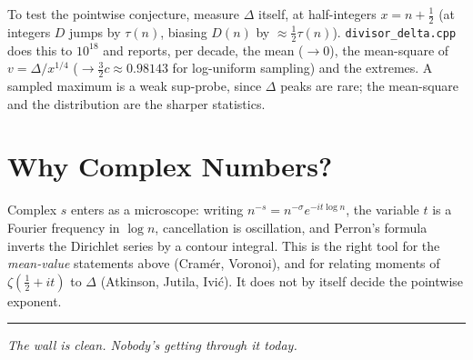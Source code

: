 \documentclass[12pt]{article}
\theoremstyle{definition}
\begin{document}
To test the pointwise conjecture, measure $\Delta$ itself, at half-integers $x=n+\tfrac12$
(at integers $D$ jumps by $\tau(n)$, biasing $D(n)$ by $\approx\tfrac12\tau(n)$).
\texttt{divisor\_delta.cpp} does this to $10^{18}$ and reports, per decade,
the mean ($\to0$), the mean-square of $v=\Delta/x^{1/4}$ ($\to\tfrac32c\approx0.98143$ for
log-uniform sampling) and the extremes.  A sampled maximum is a weak sup-probe, since
$\Delta$ peaks are rare; the mean-square and the distribution are the sharper statistics.

\section{Why Complex Numbers?}

Complex $s$ enters as a microscope: writing $n^{-s}=n^{-\sigma}e^{-it\log n}$, the variable
$t$ is a Fourier frequency in $\log n$, cancellation is oscillation, and Perron's formula
inverts the Dirichlet series by a contour integral.  This is the right tool for the
\emph{mean-value} statements above (Cram\'er, Voronoi), and for relating moments of
$\zeta(\tfrac12+it)$ to $\Delta$ (Atkinson, Jutila, Ivi\'c).  It does not by itself decide
the pointwise exponent.

\bigskip
\hrule
\bigskip
\noindent\textit{The wall is clean.  Nobody's getting through it today.}
\end{document}
